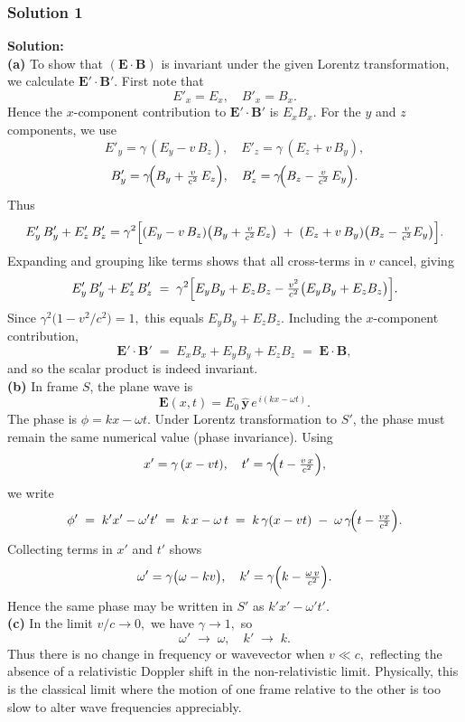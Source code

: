 \documentclass{article}
\begin{document}
\subsubsection{Solution 1}
\noindent
\textbf{Solution:}\\[6pt]
\textbf{(a)} To show that $(\mathbf{E}\cdot \mathbf{B})$ is invariant under the given Lorentz transformation, we calculate $\mathbf{E}'\cdot \mathbf{B}'$. First note that
\[
E'_x = E_x,\quad B'_x = B_x.
\]
Hence the $x$-component contribution to $\mathbf{E}'\cdot \mathbf{B}'$ is $E_x B_x$. For the $y$ and $z$ components, we use
\[
E'_y = \gamma\,(E_y - v\,B_z),\quad E'_z = \gamma\,(E_z + v\,B_y), 
\]
\[
B'_y = \gamma\!\Bigl(B_y + \tfrac{v}{c^2}\,E_z\Bigr), \quad
B'_z = \gamma\!\Bigl(B_z - \tfrac{v}{c^2}\,E_y\Bigr).
\]
Thus
\[
E'_y\,B'_y + E'_z\,B'_z 
=\gamma^2\Bigl[(E_y - v\,B_z)\bigl(B_y + \tfrac{v}{c^2}E_z\bigr)\;+\;(E_z + v\,B_y)\bigl(B_z - \tfrac{v}{c^2}E_y\bigr)\Bigr].
\]
Expanding and grouping like terms shows that all cross-terms in $v$ cancel, giving
\[
E'_y\,B'_y + E'_z\,B'_z \;=\;\gamma^2 \Bigl[E_y B_y + E_z B_z - \tfrac{v^2}{c^2}\bigl(E_y B_y + E_z B_z\bigr)\Bigr].
\]
Since $\gamma^2\bigl(1 - v^2/c^2\bigr) = 1,$ this equals $E_y B_y + E_z B_z$. Including the $x$-component contribution,
\[
\mathbf{E}'\cdot\mathbf{B}' \;=\; E_x B_x + E_y B_y + E_z B_z \;=\; \mathbf{E}\cdot\mathbf{B},
\]
and so the scalar product is indeed invariant.\\[6pt]
\textbf{(b)} In frame $S$, the plane wave is 
\[
\mathbf{E}(x,t) = E_0\,\hat{\mathbf{y}}\,e^{\,i(kx - \omega t)}.
\]
The phase is $\phi = kx - \omega t.$ Under Lorentz transformation to $S'$, the phase must remain the same numerical value (phase invariance). Using 
\[
x' = \gamma\,(x - vt), \quad t' = \gamma\!\Bigl(t - \tfrac{v\,x}{c^2}\Bigr),
\]
we write
\[
\phi' \;=\; k'x' - \omega' t'
\;=\; k\,x - \omega\,t
\;=\;
k\,\gamma(x - vt) \;-\;\omega\,\gamma\!\Bigl(t - \tfrac{vx}{c^2}\Bigr).
\]
Collecting terms in $x'$ and $t'$ shows
\[
\omega' = \gamma\bigl(\omega - kv\bigr),
\quad
k' = \gamma\Bigl(k - \tfrac{\omega\,v}{c^2}\Bigr).
\]
Hence the same phase may be written in $S'$ as $k'x' - \omega' t'.$\\[6pt]
\textbf{(c)} In the limit $v/c \to 0,$ we have $\gamma \to 1,$ so
\[
\omega' \;\to\; \omega,\quad k' \;\to\; k.
\]
Thus there is no change in frequency or wavevector when $v \ll c,$ reflecting the absence of a relativistic Doppler shift in the non-relativistic limit. Physically, this is the classical limit where the motion of one frame relative to the other is too slow to alter wave frequencies appreciably.
\end{document}
